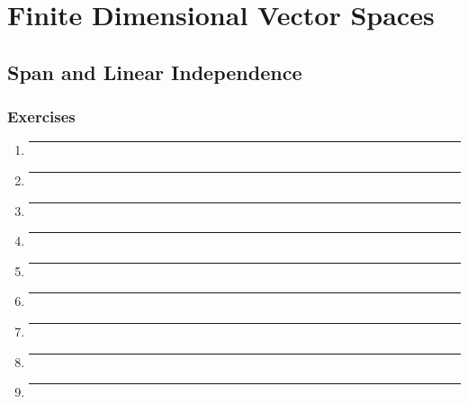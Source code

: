 \chapter{Finite Dimensional Vector Spaces}
\section*{Span and Linear Independence}
\subsection*{Exercises}


\begin{enumerate}[label=\textbf{\arabic*}]

  \item{
    \label{ssec: Ex2A-1}
    \lipsum[66]
    \bigbreak
    \hrule
    \bigbreak
  }

  \item{
    \lipsum[75]
    \bigbreak
    \hrule
    \bigbreak
  }

  \item{
    \lipsum[74]
    \bigbreak
    \hrule
    \bigbreak
  }

  \item{
    \lipsum[28]
    \bigbreak
    \hrule
    \bigbreak
  }

  \item{
    \lipsum[32]
    \bigbreak
    \hrule
    \bigbreak
  }

  \item{
    \lipsum[27]
    \bigbreak
    \hrule
    \bigbreak
  }

  \item{
    \lipsum[4]
    \bigbreak
    \hrule
    \bigbreak
  }

  \item{
    \lipsum[17]
    \bigbreak
    \hrule
    \bigbreak
  }

  \item{
    \lipsum[6]
    \bigbreak
    \hrule
    \bigbreak
  }


\end{enumerate}
